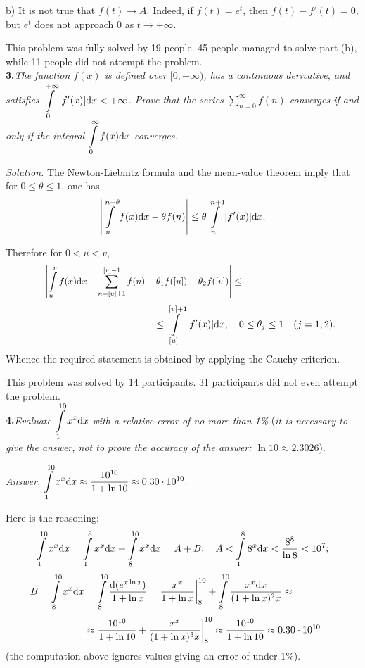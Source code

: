 \documentclass[12pt]{amsart}
\begin{document}
b) It is not true that $f(t)\to A$.
Indeed, if $f(t)=e^t$, then $f(t)-f'(t)=0$, but $e^t$ does not approach 0 as
$t\to+\infty$.

This problem was fully solved by 19 people.
45 people managed to solve part (b), while 11 people did not attempt the
problem.\\

\textbf{3.}\quad\textit{The function $f(x)$ is defined over $[0,+\infty)$,
has a continuous derivative, and satisfies
$\displaystyle\int\limits_0^{+\infty}|f'(x)|\text{\normalfont d}x<+\infty$.
Prove that the series $\displaystyle\sum\limits_{n=0}^\infty f(n)$ converges if
and only if the integral
$\displaystyle\int\limits_0^\infty f(x)\text{\normalfont d}x$ converges.}

\textit{Solution.}
The Newton-Liebnitz formula and the mean-value theorem imply
that for $0\leq\theta\leq1$, one has
$$\left|\int\limits_n^{n+\theta}f(x)\text dx-\theta f(n)\right|
\leq\theta\int\limits_n^{n+1}|f'(x)|\text dx.$$

Therefore for $0<u<v$,
$$\hspace{10ex}\left|\int\limits_u^vf(x)\text dx-\sum\limits_{n=[u]+1}^{[v]-1}
f(n)-\theta_1f([u])-\theta_2f([v])\right|\leq\hspace{30ex}$$
$$\hspace{30ex}\leq\int\limits_{[u]}^{[v]+1}|f'(x)|\text dx,\quad0\leq\theta_j
\leq1\quad(j=1,2).$$
Whence the required statement is obtained by applying the Cauchy criterion.

This problem was solved by 14 participants.
31 participants did not even attempt the problem.\\

\textbf{4.}\quad\textit{Evaluate $\displaystyle\int\limits_1^{10}x^x\text dx$
with a relative error of no more than 1\% }(\textit{it is necessary to give the
answer, not to prove the accuracy of the answer; $\ln10\approx2.3026$}).

\textit{Answer.}
$\displaystyle\int\limits_1^{10}x^x\text dx\approx\frac{10^{10}}{1+\ln10}\approx
0.30\cdot10^{10}.$

Here is the reasoning:
$$\int\limits_1^{10}x^x\text dx=\int\limits_1^8x^x\text dx+\int\limits_8^{10}x^x
\text dx=A+B;\quad A<\int\limits_1^88^x\text dx<\frac{8^8}{\ln8}<10^7;$$
$$B=\int\limits_8^{10}x^x\text dx=\int\limits_8^{10}\frac{\text d(e^{x\ln x})}
{1+\ln x}=\frac{x^x}{1+\ln x}\bigg\rvert_8^{10}+\int\limits_8^{10}
\frac{x^x\text dx}{(1+\ln x)^2x}\approx\hspace{10ex}$$
$$\hspace{10ex}\approx\frac{10^{10}}{1+\ln10}+\frac{x^x}{(1+\ln x)^3x}
\bigg\rvert_8^{10}\approx\frac{10^{10}}{1+\ln10}\approx0.30\cdot10^{10}$$
(the computation above ignores values giving an error of under 1\%).
\end{document}

